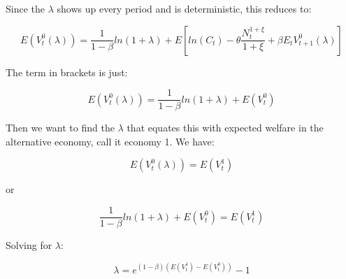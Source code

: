 \documentclass[cn,10pt,math=newtx,citestyle=gb7714-2015,bibstyle=gb7714-2015]{elegantbook}
\begin{document}
	Since the $\lambda$ shows up every period and is deterministic, this reduces to:
	
	$$E(V_t^0(\lambda))=\frac{1}{1-\beta}ln(1+\lambda)+E\left[ln(C_t)-\theta\frac{N_t^{1+\xi}}{1+\xi}+\beta E_tV_{t+1}^0(\lambda)\right]$$
	
	The term in brackets is just:
	
	$$E(V_t^0(\lambda))=\frac{1}{1-\beta}ln(1+\lambda)+E(V_t^0)$$
	
	Then we want to find the $\lambda$  that equates this with expected welfare in the alternative economy, call it economy 1. We have:
	
	$$E(V_t^0(\lambda))=E(V_t^1)$$
	
	or
	
	$$\frac{1}{1-\beta}ln(1+\lambda)+E(V_t^0)=E(V_t^1)$$
	
	Solving for $\lambda$:
	
	$$\lambda=e^{(1-\beta)(E(V_t^1)-E(V_t^0))}-1$$
	
\end{document}
